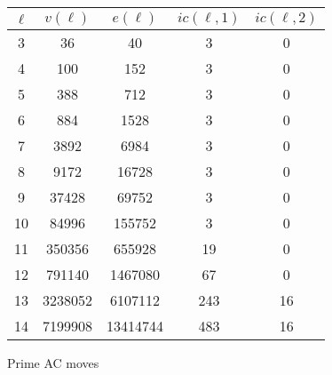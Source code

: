 \begin{figure}
	\begin{tabular}{|c|c|c|c|c|}
		\hline
		$\ell$ & $v(\ell)$ & $e(\ell)$ & $ic(\ell,1)$ & $ic(\ell,2)$ \\ \hline
		3 & 36 & 40 & 3 & 0 \\ \hline
		4 & 100 & 152 & 3 & 0 \\ \hline
		5 & 388 & 712 & 3 & 0 \\ \hline
		6 & 884 & 1528 & 3 & 0 \\ \hline
		7 & 3892 & 6984 & 3 & 0 \\ \hline
		8 & 9172 & 16728 & 3 & 0 \\ \hline
		9 & 37428 & 69752 & 3 & 0 \\ \hline
		10 & 84996 & 155752 & 3 & 0 \\ \hline
		11 & 350356 & 655928 & 19 & 0 \\ \hline
		12 & 791140 & 1467080 & 67 & 0 \\ \hline
		13 & 3238052 & 6107112 & 243 & 16 \\ \hline
		14 & 7199908 & 13414744 & 483 & 16 \\ \hline
	\end{tabular}
	\caption{Prime AC moves}
	\label{fig:prime_persistence}
\end{figure}


